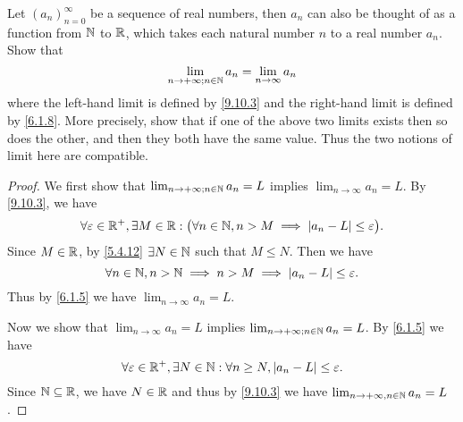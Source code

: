 \exercisesection

\begin{ex}\label{ex:9.10.1}
  Let \((a_n)_{n = 0}^\infty\) be a sequence of real numbers, then \(a_n\) can also be thought of as a function from \(\mathbb{N}\) to \(\mathbb{R}\), which takes each natural number \(n\) to a real number \(a_n\).
  Show that
  \[
    \lim_{n \to +\infty ; n \in \mathbb{N}} a_n = \lim_{n \to \infty} a_n
  \]
  where the left-hand limit is defined by \cref{9.10.3} and the right-hand limit is defined by \cref{6.1.8}.
  More precisely, show that if one of the above two limits exists then so does the other, and then they both have the same value.
  Thus the two notions of limit here are compatible.
\end{ex}

\begin{proof}
  We first show that \(\lim_{n \to +\infty ; n \in \mathbb{N}} a_n = L\) implies \(\lim_{n \to \infty} a_n = L\).
  By \cref{9.10.3}, we have
  \[
    \forall \varepsilon \in \mathbb{R}^+, \exists M \in \mathbb{R} : \big(\forall n \in \mathbb{N}, n > M \implies \left\lvert a_n - L\right\rvert \leq \varepsilon\big).
  \]
  Since \(M \in \mathbb{R}\), by \cref{5.4.12} \(\exists N \in \mathbb{N}\) such that \(M \leq N\).
  Then we have
  \[
    \forall n \in \mathbb{N}, n > \mathbb{N} \implies n > M \implies \left\lvert a_n - L\right\rvert \leq \varepsilon.
  \]
  Thus by \cref{6.1.5} we have \(\lim_{n \to \infty} a_n = L\).

  Now we show that \(\lim_{n \to \infty} a_n = L\) implies \(\lim_{n \to +\infty ; n \in \mathbb{N}} a_n = L\).
  By \cref{6.1.5} we have
  \[
    \forall \varepsilon \in \mathbb{R}^+, \exists N \in \mathbb{N} : \forall n \geq N, \left\lvert a_n - L\right\rvert \leq \varepsilon.
  \]
  Since \(\mathbb{N} \subseteq \mathbb{R}\), we have \(N \in \mathbb{R}\) and thus by \cref{9.10.3} we have \(\lim_{n \to +\infty, n \in \mathbb{N}} a_n = L\).
\end{proof}